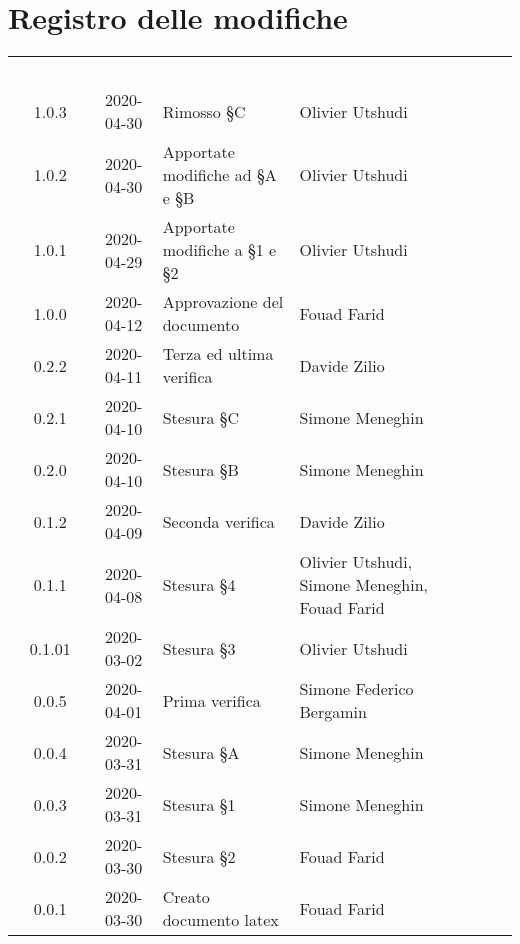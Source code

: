\section*{Registro delle modifiche}
{
	\centering
	\begin{longtable}{ c c  C{4cm}  C{3.5cm}  C{3.5cm} }
		\textcolor{white}{\textbf{Versione}} & \textcolor{white}{\textbf{Data}} & \textcolor{white}{\textbf{Descrizione}} & \textcolor{white}{\textbf{Nominativo}} & \textcolor{white}{\textbf{Ruolo}}\\		
		1.0.3 & 2020-04-30 & Rimosso §C & Olivier Utshudi &\prog \\		
		1.0.2 & 2020-04-30 & Apportate modifiche ad §A e §B & Olivier Utshudi &\prog \\
		1.0.1 & 2020-04-29 & Apportate modifiche a §1 e §2 & Olivier Utshudi &\prog \\
		1.0.0 & 2020-04-12 & Approvazione del documento & Fouad Farid &\RdP{} \\
		0.2.2 & 2020-04-11 & Terza ed ultima verifica & Davide Zilio &\ver{} \\
		0.2.1 & 2020-04-10 & Stesura \S C & Simone Meneghin &\prog{} \\
		0.2.0 & 2020-04-10 & Stesura \S B & Simone Meneghin &\prog{} \\
		0.1.2 & 2020-04-09 & Seconda verifica & Davide Zilio &\ver{} \\
		0.1.1 & 2020-04-08 & Stesura \S 4 & Olivier Utshudi, Simone Meneghin, Fouad Farid &\prog{} \\
		0.1.01 & 2020-03-02 & Stesura \S 3 & Olivier Utshudi &\prog{} \\
		0.0.5 & 2020-04-01 & Prima verifica & Simone Federico Bergamin &\ver{} \\
		0.0.4 & 2020-03-31 & Stesura \S A & Simone Meneghin &\prog{} \\
		0.0.3 & 2020-03-31 & Stesura \S 1 & Simone Meneghin &\prog{} \\
		0.0.2 & 2020-03-30 & Stesura \S 2 & Fouad Farid &\prog{} \\
		0.0.1 & 2020-03-30 & Creato documento latex & Fouad Farid &\prog{}\\		
		
	\end{longtable}

}